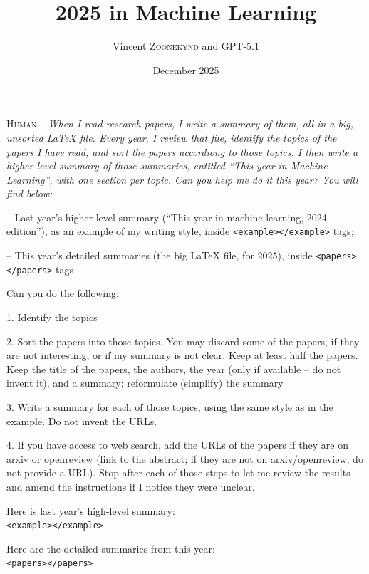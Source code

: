 \documentclass[a5paper]{article}
\title{2025 in Machine Learning}
\author{Vincent \textsc{Zoonekynd} and GPT-5.1}
\date{December 2025}
\def\section#1{\clearpage{\vspace*{0cm}\LARGE\centering\bfseries #1\par\bigskip\bigskip}}
\begin{document}
\maketitle
\thispagestyle{empty}
\clearpage
\sloppy

\section{Prompts}\label{prompt}

\textsc{Human --}
\itshape
When I read research papers, I write a summary of them, all in a big,
unsorted \LaTeX{} file. Every year, I review that file, identify the topics
of the papers I have read, and sort the papers accordiong to those
topics. I then write a higher-level summary of those summaries, entitled
``This year in Machine Learning'', with one section per topic. Can you
help me do it this year? You will find below:

-- Last year's higher-level
summary (``This year in machine learning, 2024 edition''), as an example
of my writing style, inside \texttt{<example></example>} tags;

-- This year's detailed summaries (the big \LaTeX{} file, for 2025),
inside \texttt{<papers></papers>} tags

Can you do the following:

1. Identify the topics

2. Sort the
papers into those topics. You may discard some of the papers, if they
are not interesting, or if my summary is not clear. Keep at least half
the papers. Keep the title of the papers, the authors, the year (only if
available -- do not invent it), and a summary; reformulate (simplify)
the summary

3. Write a summary for each of those topics, using the same
style as in the example. Do not invent the URLs.

4. If you have access
to web search, add the URLs of the papers if they are on arxiv or
openreview (link to the abstract; if they are not on arxiv/openreview,
do not provide a URL). Stop after each of those steps to let me review
the results and amend the instructions if I notice they were unclear.

Here is last year's high-level summary:\\
\texttt{<example></example>}

Here are the detailed summaries from this year:\\
\texttt{<papers></papers>}
\upshape
\end{document}

